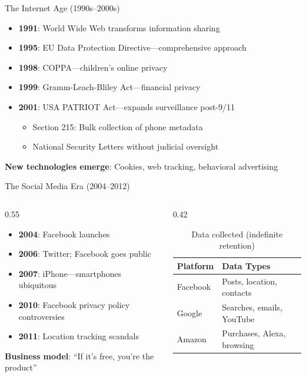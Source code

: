 ﻿\documentclass[aspectratio=169,11pt]{beamer}
\begin{document}
\begin{frame}{The Internet Age (1990s--2000s)}
\begin{itemize}
    \item \textbf{1991}: World Wide Web transforms information sharing
    \item \textbf{1995}: EU Data Protection Directive---comprehensive approach
    \item \textbf{1998}: COPPA---children's online privacy
    \item \textbf{1999}: Gramm-Leach-Bliley Act---financial privacy
    \item \textbf{2001}: USA PATRIOT Act---expands surveillance post-9/11
    \begin{itemize}
        \item Section 215: Bulk collection of phone metadata
        \item National Security Letters without judicial oversight
    \end{itemize}
\end{itemize}

\vspace{0.3em}
\textbf{New technologies emerge}: Cookies, web tracking, behavioral advertising
\end{frame}

\begin{frame}{The Social Media Era (2004--2012)}
\begin{columns}[T]
\begin{column}{0.55\textwidth}
\begin{itemize}
    \item \textbf{2004}: Facebook launches
    \item \textbf{2006}: Twitter; Facebook goes public
    \item \textbf{2007}: iPhone---smartphones ubiquitous
    \item \textbf{2010}: Facebook privacy policy controversies
    \item \textbf{2011}: Location tracking scandals
\end{itemize}

\vspace{0.3em}
\textbf{Business model}: ``If it's free, you're the product''
\end{column}
\begin{column}{0.42\textwidth}
\begin{table}[h]
\centering
\scriptsize
\begin{tabular}{@{}ll@{}}
\toprule
\textbf{Platform} & \textbf{Data Types} \\
\midrule
Facebook & Posts, location, contacts \\
Google & Searches, emails, YouTube \\
Amazon & Purchases, Alexa, browsing \\
\bottomrule
\end{tabular}
\caption{\scriptsize Data collected (indefinite retention)}
\end{table}
\end{column}
\end{columns}
\end{frame}
\end{document}

